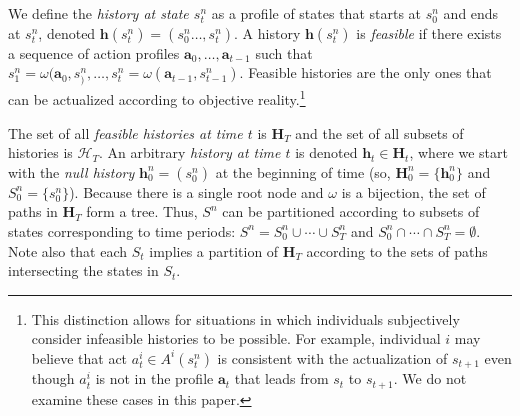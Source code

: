 \documentclass[
11pt,
titlepage,
reqno,
]{article}%
\theoremstyle{definition}
\begin{document}
We define the \textit{history at state $s^n_t$} as a profile of states that starts at $s^n_0$ and ends at $s^n_t$, denoted $\mathbf{h}(s^n_t)=(s^n_0\ldots,s^n_t)$.
A history $\mathbf{h}(s^n_t)$ is \textit{feasible} if there exists a sequence of action profiles $\mathbf{a}_0,\ldots,\mathbf{a}_{t-1}$ such that $s^n_1=\omega(\mathbf{a}_0,s^n_),\ldots, s^n_t=\omega(\mathbf{a}_{t-1},s^n_{t-1})$.
Feasible histories are the only ones that can be actualized according to objective reality.\footnote
{
	This distinction allows for situations in which individuals subjectively consider infeasible histories to be possible. 
	For example, individual $i$ may believe that act $a^i_t\in A^i(s^n_t)$ is consistent with the actualization of $s_{t+1}$ even though $a^i_t$ is not in the profile $\mathbf{a}_t$ that leads from $s_t$ to $s_{t+1}$.
	We do not examine these cases in this paper.
}
	
	
The set of all \textit{feasible histories at time $t$} is $\mathbf{H}_T$ and the set of all subsets of histories is $\mathcal{H}_T$.
An arbitrary \textit{history at time $t$} is denoted $\mathbf{h}_t\in \mathbf{H}_t$, where we start with the \textit{null history} $\mathbf{h}^n_0=(s^n_0)$ at the beginning of time (so, $\mathbf{H}^n_0=\{\mathbf{h}^n_0\}$ and  $S^n_0=\{s^n_0\}$).   
Because there is a single root node and $\omega$ is a bijection, the set of paths in $\mathbf{H}_T$ form a tree.
Thus, $S^n$ can be partitioned according to  subsets of states corresponding to time periods: $S^n=S^n_0\cup\cdots\cup S^n_T$ and $S^n_0\cap\cdots\cap S^n_T = \emptyset$.
Note also that each $S_t$ implies a partition of $\mathbf{H}_T$ according to the sets of paths intersecting the states in $S_t$.

\end{document}
